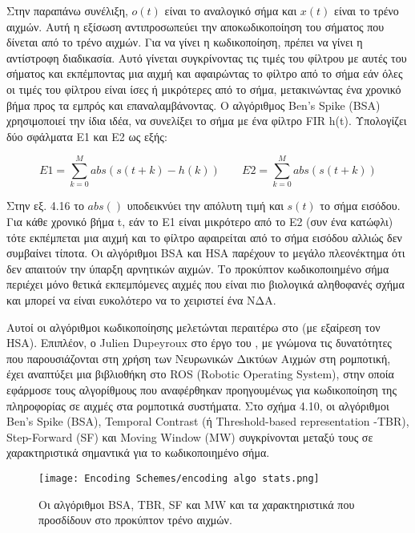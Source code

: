 \documentclass[12pt]{report}
\begin{document}
Στην παραπάνω συνέλιξη, \(o(t)\) είναι το αναλογικό σήμα και \(x(t)\) είναι το τρένο αιχμών. Αυτή η εξίσωση αντιπροσωπεύει την αποκωδικοποίηση του σήματος που δίνεται από το τρένο αιχμών. Για να γίνει η κωδικοποίηση, πρέπει να γίνει η αντίστροφη διαδικασία. Αυτό γίνεται συγκρίνοντας τις τιμές του φίλτρου με αυτές του σήματος και εκπέμποντας μια αιχμή και αφαιρώντας το φίλτρο από το σήμα εάν όλες οι τιμές του φίλτρου είναι ίσες ή μικρότερες από το σήμα, μετακινώντας ένα χρονικό βήμα προς τα εμπρός και επαναλαμβάνοντας. Ο αλγόριθμος \textlatin{Ben's Spike (BSA)} \cite{Schrauwen2003} χρησιμοποιεί την ίδια ιδέα, να συνελίξει το σήμα με ένα φίλτρο \textlatin{FIR} h(t). Υπολογίζει δύο σφάλματα Ε1 και Ε2 ως εξής:

\begin{equation}
    E1=\sum_{k=0}^{M}abs(s(t+k)-h(k)) \;\;\;\;\;\;\;
    E2=\sum_{k=0}^{M}abs(s(t+k))
\end{equation}

Στην εξ. 4.16 το \(abs()\) υποδεικνύει την απόλυτη τιμή και \(s(t)\) το σήμα εισόδου. Για κάθε χρονικό βήμα t, εάν το E1 είναι μικρότερο από το E2 (συν ένα κατώφλι) τότε εκπέμπεται μια αιχμή και το φίλτρο αφαιρείται από το σήμα εισόδου αλλιώς δεν συμβαίνει τίποτα. Οι αλγόριθμοι \textlatin{BSA} και \textlatin{HSA} παρέχουν το μεγάλο πλεονέκτημα ότι δεν απαιτούν την ύπαρξη αρνητικών αιχμών. Το προκύπτον κωδικοποιημένο σήμα περιέχει μόνο θετικά εκπεμπόμενες αιχμές που είναι πιο βιολογικά αληθοφανές σχήμα και μπορεί να είναι ευκολότερο να το χειριστεί ένα ΝΔΑ.

Αυτοί οι αλγόριθμοι κωδικοποίησης μελετώνται περαιτέρω στο \cite{Petro2020} (με εξαίρεση τον \textlatin{HSA}). Επιπλέον, ο \textlatin{Julien Dupeyroux} στο έργο του \cite{Dupeyroux2021}, με γνώμονα τις δυνατότητες που παρουσιάζονται στη χρήση των Νευρωνικών Δικτύων Αιχμών στη ρομποτική, έχει αναπτύξει μια βιβλιοθήκη στο \textlatin{ROS (Robotic Operating System)}, στην οποία εφάρμοσε τους αλγορίθμους που αναφέρθηκαν προηγουμένως για κωδικοποίηση της πληροφορίας σε αιχμές στα ρομποτικά συστήματα. Στο σχήμα 4.10, οι αλγόριθμοι \textlatin{Ben's Spike (BSA), Temporal Contrast} (ή \textlatin{Threshold-based representation -TBR}), \textlatin{Step-Forward (SF)} και \textlatin{Moving Window (MW)} συγκρίνονται μεταξύ τους σε χαρακτηριστικά σημαντικά για το κωδικοποιημένο σήμα.

\begin{figure}[htp]
    \centering
    \texttt{[image: Encoding Schemes/encoding algo stats.png]}
    \caption{Οι αλγόριθμοι BSA, TBR, SF και MW και τα χαρακτηριστικά που προσδίδουν στο προκύπτον τρένο αιχμών.}
    \label{fig:spikeprop-net-architecture}
\end{figure}
\end{document}
